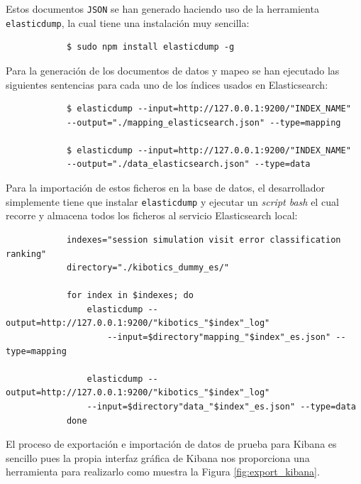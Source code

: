 \documentclass[a4paper, 12pt]{book}
\begin{document}
		Estos documentos \texttt{JSON} se han generado haciendo uso de la herramienta \texttt{elasticdump}, la cual tiene una instalación muy sencilla:
		
		{\footnotesize
		\begin{verbatim}
			$ sudo npm install elasticdump -g
		\end{verbatim}
		}
		Para la generación de los documentos de datos y mapeo se han ejecutado las siguientes sentencias para cada uno de los índices usados en Elasticsearch:
		
		{\footnotesize
		\begin{verbatim}
			$ elasticdump --input=http://127.0.0.1:9200/"INDEX_NAME" 
			--output="./mapping_elasticsearch.json" --type=mapping
			
			$ elasticdump --input=http://127.0.0.1:9200/"INDEX_NAME" 
			--output="./data_elasticsearch.json" --type=data
		\end{verbatim}
		}
	
		Para la importación de estos ficheros en la base de datos, el desarrollador simplemente tiene que instalar \texttt{elasticdump} y ejecutar un \textit{script bash} el cual recorre y almacena todos los ficheros al servicio Elasticsearch local:
		
		{\footnotesize
		\begin{verbatim}
			indexes="session simulation visit error classification ranking"
			directory="./kibotics_dummy_es/"
			
			for index in $indexes; do
			    elasticdump --output=http://127.0.0.1:9200/"kibotics_"$index"_log" 
			        --input=$directory"mapping_"$index"_es.json" --type=mapping
			
			    elasticdump --output=http://127.0.0.1:9200/"kibotics_"$index"_log" 
		        --input=$directory"data_"$index"_es.json" --type=data
			done
		\end{verbatim}
		}
		
		El proceso de exportación e importación de datos de prueba para Kibana es sencillo pues la propia interfaz gráfica de Kibana nos proporciona una herramienta para realizarlo como muestra la Figura \ref{fig:export_kibana}.
		
\end{document}
